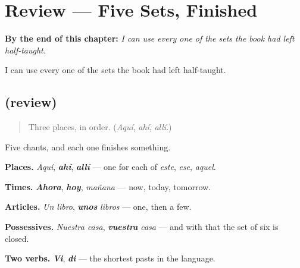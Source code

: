 
\chapter{Review --- Five Sets, Finished}
\label{ch:repaso-parejas}

\begin{chapteropening}
\textbf{By the end of this chapter:} \emph{I can use every one of the sets the book had left half-taught.}

I can use every one of the sets the book had left half-taught.
\end{chapteropening}

\section[(review)]{(review)}

\label{lesson:ES-C65-repaso-parejas}



\begin{quote}
Three places, in order. (\emph{Aquí}, \emph{ahí}, \emph{allí}.)
\end{quote}

\begin{grammarlens}[title={What you've built}]
Five chants, and each one finishes something.

\textbf{Places.} \emph{Aquí}, \emph{\textbf{ahí}}, \emph{\textbf{allí}} — one for each of \emph{este}, \emph{ese}, \emph{aquel}.

\textbf{Times.} \emph{\textbf{Ahora}}, \emph{\textbf{hoy}}, \emph{mañana} — now, today, tomorrow.

\textbf{Articles.} \emph{Un libro}, \emph{\textbf{unos}} \emph{libros} — one, then a few.

\textbf{Possessives.} \emph{Nuestra casa}, \emph{\textbf{vuestra}} \emph{casa} — and with that the set of six is closed.

\textbf{Two verbs.} \emph{\textbf{Vi}}, \emph{\textbf{di}} — the shortest pasts in the language.
\end{grammarlens}

